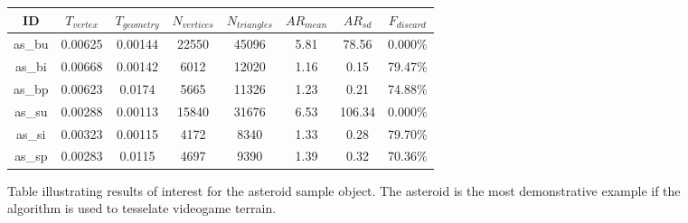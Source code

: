 \documentclass[]{article}
\begin{document}
\begin{figure}[htb]
\centering
\begin{tabular}{|c|c|c|c|c|c|c|c|}
\hline
ID & $T_{vertex}$ & $T_{geometry}$ & $N_{vertices}$ & $N_{triangles}$ & $AR_{mean}$ & $AR_{sd}$ & $F_{discard}$ \\ \hline
as\_bu & 0.00625 & 0.00144 & 22550 & 45096 & 5.81 & 78.56 & 0.000\% \\ \hline
as\_bi & 0.00668 & 0.00142 & 6012 & 12020 & 1.16 & 0.15 & 79.47\% \\ \hline
as\_bp & 0.00623 & 0.0174 & 5665 & 11326 & 1.23 & 0.21 & 74.88\% \\ \hline
as\_su & 0.00288 & 0.00113 & 15840 & 31676 & 6.53 & 106.34 & 0.000\% \\ \hline
as\_si & 0.00323 & 0.00115 & 4172 & 8340 & 1.33 & 0.28 & 79.70\% \\ \hline
as\_sp & 0.00283 & 0.0115 & 4697 & 9390 & 1.39 & 0.32 & 70.36\% \\ \hline
\end{tabular}
\caption{Table illustrating results of interest for the asteroid sample object. The asteroid is the most demonstrative example if the algorithm is used to tesselate videogame terrain.}
\label{fig:asteroidexcerpt}
\end{figure}
\end{document}
